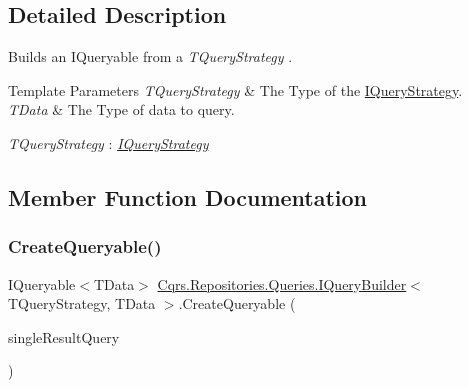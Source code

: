 \subsection{Detailed Description}
Builds an I\+Queryable from a {\itshape T\+Query\+Strategy} . 


\begin{DoxyTemplParams}{Template Parameters}
{\em T\+Query\+Strategy} & The Type of the \hyperlink{interfaceCqrs_1_1Repositories_1_1Queries_1_1IQueryStrategy}{I\+Query\+Strategy}.\\
\hline
{\em T\+Data} & The Type of data to query.\\
\hline
\end{DoxyTemplParams}
\begin{Desc}
\item[Type Constraints]\begin{description}
\item[{\em T\+Query\+Strategy} : {\em \hyperlink{interfaceCqrs_1_1Repositories_1_1Queries_1_1IQueryStrategy}{I\+Query\+Strategy}}]\end{description}
\end{Desc}


\subsection{Member Function Documentation}
\mbox{\label{interfaceCqrs_1_1Repositories_1_1Queries_1_1IQueryBuilder_a83cb87d485491c6d38fe8fa6fd649373_a83cb87d485491c6d38fe8fa6fd649373}} 
\subsubsection{\texorpdfstring{Create\+Queryable()}{CreateQueryable()}\hspace{0.1cm}{\footnotesize\ttfamily [1/2]}}
{\footnotesize\ttfamily I\+Queryable$<$T\+Data$>$ \hyperlink{interfaceCqrs_1_1Repositories_1_1Queries_1_1IQueryBuilder}{Cqrs.\+Repositories.\+Queries.\+I\+Query\+Builder}$<$ T\+Query\+Strategy, T\+Data $>$.Create\+Queryable (\begin{DoxyParamCaption}\item[{\hyperlink{interfaceCqrs_1_1Repositories_1_1Queries_1_1ISingleResultQuery}{I\+Single\+Result\+Query}$<$ T\+Query\+Strategy, T\+Data $>$}]{single\+Result\+Query }\end{DoxyParamCaption})}



